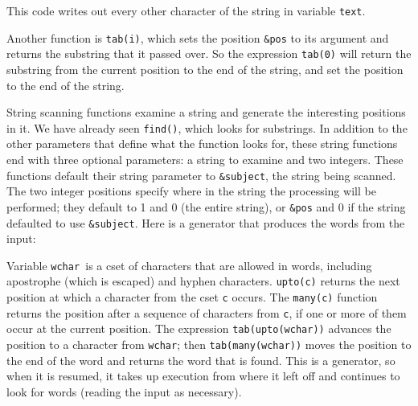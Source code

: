 
This code writes out every other character of the string in variable
\texttt{text}.

Another function is \texttt{tab(i)}, which sets the
position \texttt{\&pos} to its argument and returns the substring that
it passed over. So the expression \texttt{tab(0)} will return the
substring from the current position to the end of the string, and set
the position to the end of the string.

String scanning functions examine a string and generate the interesting
positions in it. We have already seen \texttt{find()},
which looks for substrings. In addition to the other parameters that
define what the function looks for, these string functions end with
three optional parameters: a string to examine and two integers. These
functions default their string
parameter to \texttt{\&subject}, the string being scanned. The two
integer positions specify where in the string the processing will be
performed; they default to 1 and 0 (the entire string), or
\texttt{\&pos} and 0 if the string defaulted to use \texttt{\&subject}.
Here is a generator that produces the words from the
input:


Variable \texttt{wchar}\texttt{ }is a cset of characters that are
allowed in words, including apostrophe (which is escaped) and hyphen
characters. \texttt{upto(c)} returns the next position
at which a character from the cset \texttt{c} occurs. The
\texttt{many(c)} function returns the position after a
sequence of characters from \texttt{c}, if one or more of them occur at
the current position. The expression \texttt{tab(upto(wchar))} advances
the position to a character from \texttt{wchar}; then
\texttt{tab(many(wchar))} moves the position to the end of the word and
returns the word that is found. This is a generator, so when it is
resumed, it takes up execution from where it left off and continues to
look for words (reading the input as necessary).

